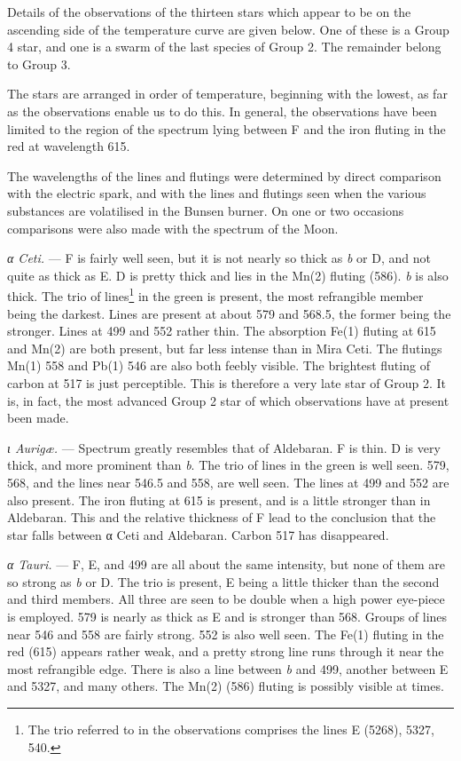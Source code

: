 \documentclass[a4paper, 12pt, oneside, polutonikogreek, english]{article}
\begin{document}
Details of the observations of the thirteen stars which appear to be on the ascending side of the temperature curve are given below. One of these is a Group 4 star, and one is a swarm of the last species of Group 2. The remainder belong to Group 3.

The stars are arranged in order of temperature, beginning with the lowest, as far as the observations enable us to do this. In general, the observations have been limited to the region of the spectrum lying between F and the iron fluting in the red at wavelength 615.

The wavelengths of the lines and flutings were determined by direct comparison with the electric spark, and with the lines and flutings seen when the various substances are volatilised in the Bunsen burner. On one or two occasions comparisons were also made with the spectrum of the Moon.

\emph{α Ceti.} --- F is fairly well seen, but it is not nearly so thick as \emph{b} or D, and not quite as thick as E. D is pretty thick and lies in the Mn(2) fluting (586). \emph{b} is also thick. The trio of lines\footnote{The trio referred to in the observations comprises the lines E (5268), 5327, 540.} in the green is present, the most refrangible member being the darkest. Lines are present at about 579 and 568.5, the former being the stronger. Lines at 499 and 552 rather thin. The absorption Fe(1) fluting at 615 and Mn(2) are both present, but far less intense than in Mira Ceti. The flutings Mn(1) 558 and Pb(1) 546 are also both feebly visible. The brightest fluting of carbon at 517 is just perceptible. This is therefore a very late star of Group 2. It is, in fact, the most advanced Group 2 star of which observations have at present been made.

\emph{ι Aurigæ.} --- Spectrum greatly resembles that of Aldebaran. F is thin. D is very thick, and more prominent than \emph{b}. The trio of lines in the green is well seen. 579, 568, and the lines near 546.5 and 558, are well seen. The lines at 499 and 552 are also present. The iron fluting at 615 is present, and is a little stronger than in Aldebaran. This and the relative thickness of F lead to the conclusion that the star falls between α Ceti and Aldebaran. Carbon 517 has disappeared.

\emph{α Tauri.} --- F, E, and 499 are all about the same intensity, but none of them are so strong as \emph{b} or D. The trio is present, E being a little thicker than the second and third members. All three are seen to be double when a high power eye-piece is employed. 579 is nearly as thick as E and is stronger than 568. Groups of lines near 546 and 558 are fairly strong. 552 is also well seen. The Fe(1) fluting in the red (615) appears rather weak, and a pretty strong line runs through it near the most refrangible edge. There is also a line between \emph{b} and 499, another between E and 5327, and many others. The Mn(2) (586) fluting is possibly visible at times.
\end{document}
